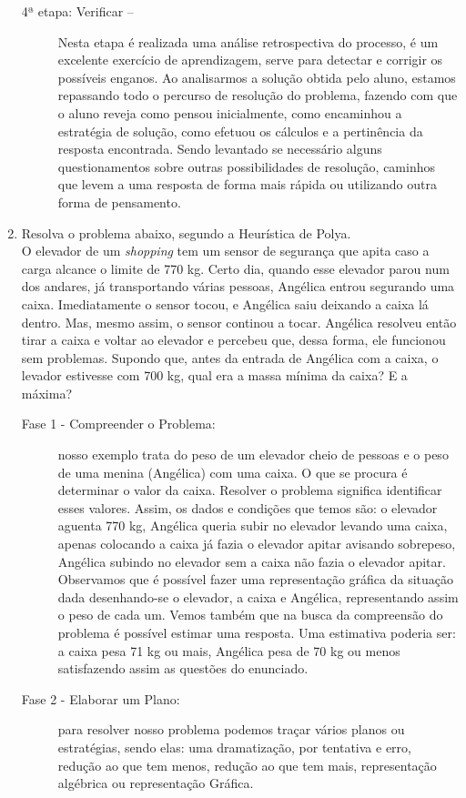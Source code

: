 \documentclass[a4paper, 12pt]{article}
\begin{document}
\begin{enumerate}
\begin{description}
  \item[4ª etapa: Verificar –]
    Nesta etapa é realizada uma análise retrospectiva do processo, é um excelente exercício de aprendizagem, serve para detectar e corrigir os possíveis enganos. Ao analisarmos a solução obtida pelo aluno, estamos repassando todo o percurso de resolução do problema, fazendo com que o aluno reveja como pensou inicialmente, como encaminhou a estratégia de solução, como efetuou os cálculos e a pertinência da resposta encontrada. Sendo levantado se necessário alguns questionamentos sobre outras possibilidades de resolução, caminhos que levem a uma resposta de forma mais rápida ou utilizando outra forma de pensamento. 
  \end{description}  

\item Resolva o problema abaixo, segundo a Heurística de Polya. \\
  O elevador de um \textit{shopping} tem um sensor de segurança que apita caso a carga alcance o limite de 770 kg. Certo dia, quando esse elevador parou num dos andares, já transportando várias pessoas, Angélica entrou segurando uma caixa. Imediatamente o sensor tocou, e Angélica saiu deixando a caixa lá dentro. Mas, mesmo assim, o sensor continou a tocar. Angélica resolveu então tirar a caixa e voltar ao elevador e percebeu que, dessa forma, ele funcionou sem problemas. Supondo que, antes da entrada de Angélica com a caixa, o levador estivesse com 700 kg, qual era a massa mínima da caixa? E a máxima?
  \begin{description}
  \item[Fase 1 - Compreender o Problema:]
    nosso exemplo trata do peso de um elevador cheio de pessoas e o peso de uma menina (Angélica) com uma caixa. O que se procura é determinar o valor da caixa. Resolver o problema significa identificar esses valores. Assim, os dados e condições que temos são: o elevador aguenta 770 kg, Angélica queria subir no elevador levando uma caixa, apenas colocando a caixa já fazia o elevador apitar avisando sobrepeso, Angélica subindo no elevador sem a caixa não fazia o elevador apitar. Observamos que é possível fazer uma representação gráfica da situação dada desenhando-se o elevador, a caixa e Angélica, representando assim o peso de cada um. Vemos também que na busca da compreensão do problema é possível estimar uma resposta. Uma estimativa poderia ser: a caixa pesa 71 kg ou mais, Angélica pesa de 70 kg ou menos satisfazendo assim as questões do enunciado. 
  \item[Fase 2 - Elaborar um Plano:] para resolver nosso problema podemos traçar vários planos ou estratégias, sendo elas: uma dramatização, por tentativa e erro, redução ao que tem menos, redução ao que tem mais, representação algébrica ou representação Gráfica.

\end{description}
\end{enumerate}
\end{document}
